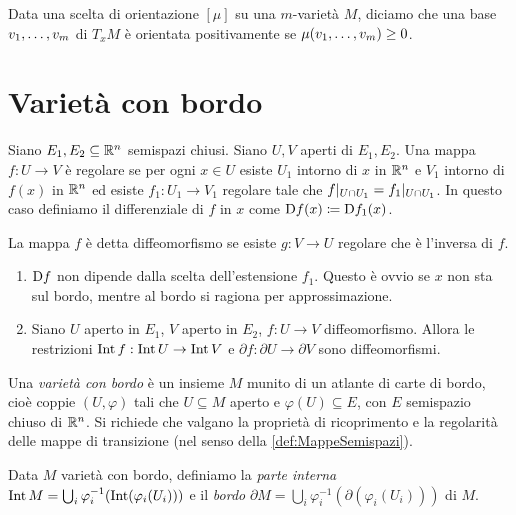 \begin{remark}
	Data una scelta di orientazione $[\mu]$ su una $m$-varietà $M$, diciamo che una base $\seqb vm,$ di $T_xM$ è orientata positivamente se $\mu(\seqb vm,)\ge 0$.
\end{remark}


\section{Varietà con bordo}

\begin{definition} \label{def:MappeSemispazi}
	Siano $E_1,E_2\subseteq \R^n$ semispazi chiusi. Siano $U,V$ aperti di $E_1,E_2$. Una mappa $f:U\to V$ è regolare se per ogni $x\in U$ esiste $U_1$ intorno di $x$ in $\R^n$ e $V_1$ intorno di $f(x)$ in $\R^n$ ed esiste $f_1:U_1\to V_1$ regolare tale che $f\restrict{U\cap U_1} = f_1\restrict{U\cap U_1}$.
	In questo caso definiamo il differenziale di $f$ in $x$ come $\Diff f(x) \coloneqq \Diff f_1(x)$.
	
	La mappa $f$ è detta diffeomorfismo se esiste $g:V\to U$ regolare che è l'inversa di $f$.
\end{definition}

\begin{remark}
	\begin{enumerate}
		\item $\Diff f$ non dipende dalla scelta dell'estensione $f_1$. Questo è ovvio se $x$ non sta sul bordo, mentre al bordo si ragiona per approssimazione.
		
		\item Siano $U$ aperto in $E_1$, $V$ aperto in $E_2$, $f:U \to V$ diffeomorfismo. Allora le restrizioni $\Int f:\Int U \to \Int V$ e $\partial f: \partial U \to \partial V$ sono diffeomorfismi.
	\end{enumerate}
\end{remark}

\begin{definition} 
	Una \emph{varietà con bordo} è un insieme $M$ munito di un atlante di carte di bordo, cioè coppie $(U,\varphi)$ tali che $U\subseteq M$ aperto e $\varphi(U)\subseteq E$, con $E$ semispazio chiuso di $\R^n$. Si richiede che valgano la proprietà di ricoprimento e la regolarità delle mappe di transizione (nel senso della \cref{def:MappeSemispazi}).
\end{definition}

\begin{definition}  
	Data $M$ varietà con bordo, definiamo la \emph{parte interna} $\Int M = \bigcup_{i} \varphi_i^{-1}(\Int (\varphi_i(U_i)))$ e il \emph{bordo} $\partial M = \bigcup_i \varphi_i^{-1}(\partial (\varphi_i(U_i)))$ di $M$.
\end{definition}

